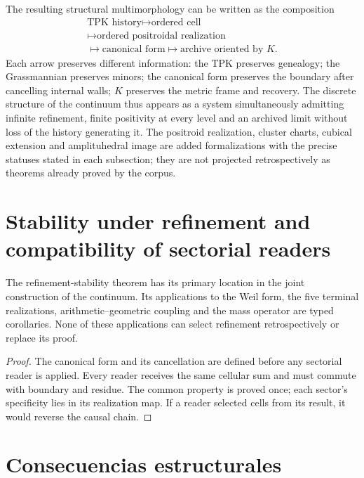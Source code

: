 The resulting structural multimorphology can be written as the composition
\[
 \boxed{
 \begin{gathered}\text{TPK history}\longmapsto\text{ordered cell}\\
 \longmapsto\text{ordered positroidal realization}\\
 \longmapsto\text{canonical form}\longmapsto\text{archive oriented by }K.\end{gathered}}
\]
Each arrow preserves different information: the TPK preserves genealogy; the Grassmannian preserves minors; the canonical form preserves the boundary after cancelling internal walls; \(K\) preserves the metric frame and recovery. The discrete structure of the continuum thus appears as a system simultaneously admitting infinite refinement, finite positivity at every level and an archived limit without loss of the history generating it. The positroid realization, cluster charts, cubical extension and amplituhedral image are added formalizations with the precise statuses stated in each subsection; they are not projected retrospectively as theorems already proved by the corpus.



\section{Stability under refinement and compatibility of sectorial readers}

\begin{theorem}
\label{geometria_positiva:thm:unidad-distribucion} The refinement-stability theorem has its primary location in the joint construction of the continuum. Its applications to the Weil form, the five terminal realizations, arithmetic--geometric coupling and the mass operator are typed corollaries. None of these applications can select refinement retrospectively or replace its proof.
\end{theorem}
\begin{proof}
The canonical form and its cancellation are defined before any sectorial reader is applied. Every reader receives the same cellular sum and must commute with boundary and residue. The common property is proved once; each sector's specificity lies in its realization map. If a reader selected cells from its result, it would reverse the causal chain.
\end{proof}

\section{Consecuencias estructurales}


